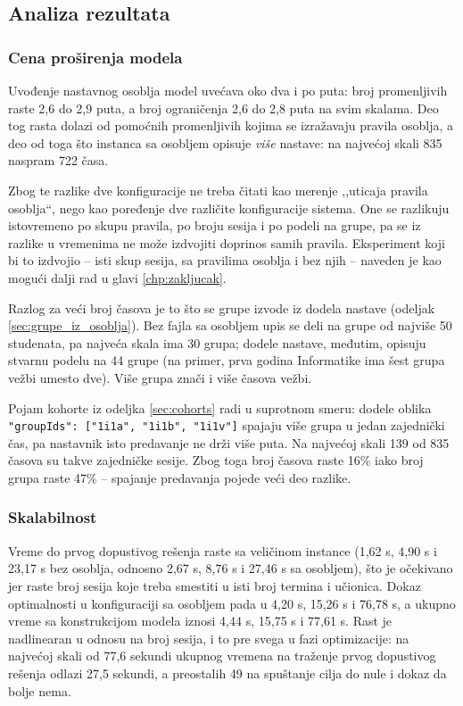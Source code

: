 \documentclass[12pt,oneside]{memoir}
\begin{document}
\subsection{Analiza rezultata}
\label{sec:finalna_analiza}

\subsubsection{Cena proširenja modela}

Uvođenje nastavnog osoblja model uvećava oko dva i po puta: broj
promenljivih raste 2,6 do 2,9 puta, a broj ograničenja 2,6 do 2,8 puta
na svim skalama. Deo tog rasta dolazi od pomoćnih promenljivih kojima se
izražavaju pravila osoblja, a deo od toga što instanca sa osobljem
opisuje \emph{više} nastave: na najvećoj skali 835 naspram 722 časa.

Zbog te razlike dve konfiguracije ne treba čitati kao merenje
,,uticaja pravila osoblja``, nego kao poređenje dve različite
konfiguracije sistema. One se razlikuju istovremeno po skupu pravila, po
broju sesija i po podeli na grupe, pa se iz razlike u vremenima ne može
izdvojiti doprinos samih pravila. Eksperiment koji bi to izdvojio --
isti skup sesija, sa pravilima osoblja i bez njih -- naveden je kao
mogući dalji rad u glavi \ref{chp:zakljucak}.

Razlog za veći broj časova je to što se grupe izvode iz dodela nastave
(odeljak \ref{sec:grupe_iz_osoblja}). Bez fajla sa osobljem upis se deli
na grupe od najviše 50 studenata, pa najveća skala ima 30 grupa; dodele
nastave, međutim, opisuju stvarnu podelu na 44 grupe (na primer, prva
godina Informatike ima šest grupa vežbi umesto dve). Više grupa znači i
više časova vežbi.

Pojam kohorte iz odeljka \ref{sec:cohorts} radi u suprotnom smeru:
dodele oblika \texttt{"groupIds": ["1i1a", "1i1b", "1i1v"]} spajaju više
grupa u jedan zajednički čas, pa nastavnik isto predavanje ne drži više
puta. Na najvećoj skali 139 od 835 časova su takve zajedničke sesije.
Zbog toga broj časova raste 16\% iako broj grupa raste 47\% -- spajanje
predavanja pojede veći deo razlike.

\subsubsection{Skalabilnost}

Vreme do prvog dopustivog rešenja raste sa veličinom instance
(1,62 s, 4,90 s i 23,17 s bez osoblja, odnosno 2,67 s, 8,76 s i 27,46 s
sa osobljem), što je očekivano jer raste broj sesija koje treba smestiti
u isti broj termina i učionica. Dokaz optimalnosti u konfiguraciji sa
osobljem pada u 4,20 s, 15,26 s i 76,78 s, a ukupno vreme sa
konstrukcijom modela iznosi 4,44 s, 15,75 s i 77,61 s. Rast je
nadlinearan u odnosu na broj sesija, i to pre svega u fazi optimizacije:
na najvećoj skali od 77,6 sekundi ukupnog vremena na traženje prvog
dopustivog rešenja odlazi 27,5 sekundi, a preostalih 49 na spuštanje
cilja do nule i dokaz da bolje nema.
\end{document}
